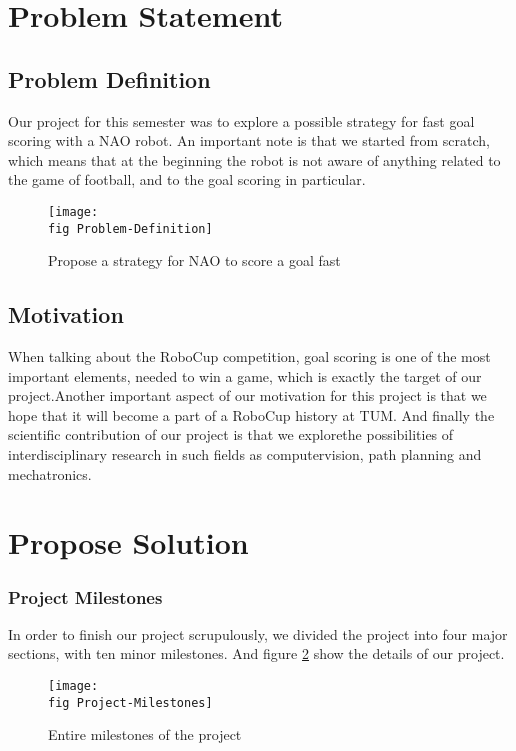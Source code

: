 \section{Problem Statement}

\subsection*{Problem Definition}
Our project for this semester was to explore a possible strategy for fast goal
scoring with a NAO robot. An important note is that we started from scratch,
which means that at the beginning the robot is not aware of anything related to
the game of football, and to the goal scoring in particular.

\begin{figure}[ht]
	\texttt{[image: \\fig Problem-Definition]}
	\caption{Propose a strategy for NAO to score a goal fast}
	\label{W a strategy for Nao}
\end{figure}


\subsection*{Motivation}
When talking about the RoboCup
competition, goal scoring is one of the
most important elements, needed to win a game, which is exactly the target of our project.Another important aspect of our motivation for this project is that we hope that it will become a part of a RoboCup history at TUM. And finally the scientific contribution of our project is that we explorethe possibilities of interdisciplinary research in such fields as computervision, path planning and mechatronics.

 
\section{Propose Solution}
\subsubsection*{Project Milestones}


In order to finish our project scrupulously, we divided the project into four major sections, with ten minor milestones. And figure \ref{W milestones of the project} show the details of our project. 

 
\begin{figure}[ht]
	\texttt{[image: \\fig Project-Milestones]}
	\caption{Entire milestones of the project}
	\label{W milestones of the project}

\end{figure}

